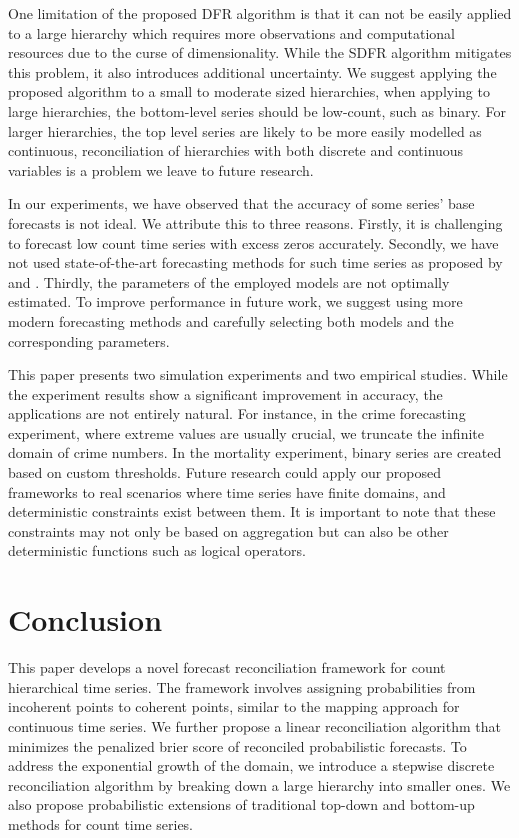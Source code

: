 \documentclass[a4paper,review,12pt,authoryear]{elsarticle}
\theoremstyle{definition}
\begin{document}
     One limitation of the proposed DFR algorithm is that it can not be easily applied to a large hierarchy which requires more observations and computational resources due to the curse of dimensionality.
     While the SDFR algorithm mitigates this problem, it also introduces additional uncertainty.
     We suggest applying the proposed algorithm to a small to moderate sized hierarchies, when applying to large hierarchies, the bottom-level series should be low-count, such as binary. For larger hierarchies, the top level series are likely to be more easily modelled as continuous, reconciliation of hierarchies with both discrete and continuous variables is a problem we leave to future research.

     In our experiments, we have observed that the accuracy of some series' base forecasts is not ideal.
     We attribute this to three reasons. Firstly, it is challenging to forecast low count time series with excess zeros accurately.
     Secondly, we have not used state-of-the-art forecasting methods for such time series as proposed by \cite{berryBayesianForecastingMany2020a} and \cite{weissEfficientAccountingEstimation2022}.
     Thirdly, the parameters of the employed models are not optimally estimated.
     To improve performance in future work, we suggest using more modern forecasting methods and carefully selecting both models and the corresponding parameters.

     This paper presents two simulation experiments and two empirical studies.
     While the experiment results show a significant improvement in accuracy, the applications are not entirely natural.
     For instance, in the crime forecasting experiment, where extreme values are usually crucial, we truncate the infinite domain of crime numbers.
     In the mortality experiment, binary series are created based on custom thresholds.
     Future research could apply our proposed frameworks to real scenarios where time series have finite domains, and deterministic constraints exist between them.
     It is important to note that these constraints may not only be based on aggregation but can also be other deterministic functions such as logical operators.




     \section{Conclusion}
     \label{sec:conclusion}

     This paper develops a novel forecast reconciliation framework for count hierarchical time series.
     The framework involves assigning probabilities from incoherent points to coherent points, similar to the mapping approach for continuous time series.
     We further propose a linear reconciliation algorithm that minimizes the penalized brier score of reconciled probabilistic forecasts.
     To address the exponential growth of the domain, we introduce a stepwise discrete reconciliation algorithm by breaking down a large hierarchy into smaller ones.
     We also propose probabilistic extensions of traditional top-down and bottom-up methods for count time series.
\end{document}
